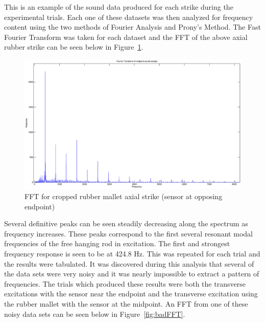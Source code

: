 This is an example of the sound data produced for each strike during the experimental trials. Each one of these datasets was then analyzed for frequency content using the two methods of Fourier Analysis and Prony's Method. The Fast Fourier Transform was taken for each dataset and the FFT of the above axial rubber strike can be seen below in Figure~\ref{fig:axial_FFT}.

\begin{figure}[h]
	\centering
	\includegraphics[width=\textwidth]{../figures/axial_rubber_endpointFFT.eps}
	\caption{FFT for cropped rubber mallet axial strike (sensor at opposing endpoint)}
	\label{fig:axial_FFT}
\end{figure}

Several definitive peaks can be seen steadily decreasing along the spectrum as frequency increases. These peaks correspond to the first several resonant modal frequencies of the free hanging rod in excitation. The first and strongest frequency response is seen to be at 424.8 Hz. This was repeated for each trial and the results were tabulated. It was discovered during this analysis that several of the data sets were very noisy and it was nearly impossible to extract a pattern of frequencies. The trials which produced these results were both the transverse excitations with the sensor near the endpoint and the transverse excitation using the rubber mallet with the sensor at the midpoint. An FFT from one of these noisy data sets can be seen below in Figure~\ref{fig:badFFT}.

